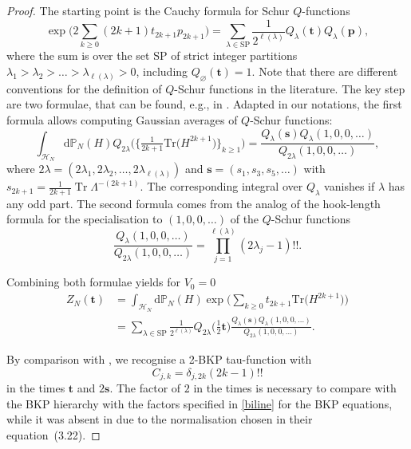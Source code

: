 \documentclass[pdftex]{sigma}
\numberwithin{equation}{section}
\newcommand{\dd}{\mathrm{d}}
\begin{document}
\begin{proof}
The starting point is the Cauchy formula for Schur $Q$-functions
\[
 \exp\biggl(2\sum_{k \geq 0} (2k+1) t_{2k+1}p_{2k+1}\biggr)
 =\sum_{\lambda \in \text{SP}} \frac{1}{2^{\ell(\lambda)}}
 Q_\lambda(\mathbf{t})Q_\lambda(\mathbf{p}),
\]
where the sum is over the set $\text{SP}$ of strict integer partitions
$\lambda_1>\lambda_2>\dots > \lambda_{\ell(\lambda)}>0$,
including $Q_\varnothing(\mathbf{t})=1$. Note that there are different conventions for the definition of $Q$-Schur functions in the literature.
The key step are two formulae, that can be found, e.g., in \cite[equations~(55) and~(56)]{Mironov:2020tjf}. Adapted in our notations, the first formula allows computing Gaussian averages of $Q$-Schur functions:
\begin{equation*}
 \int_{\mathcal{H}_N} \dd \mathbb{P}_N(H)
 Q_{2\lambda}\bigl(\bigl\{\tfrac{1}{2k+1}\mathrm{Tr}\bigl(H^{2k+1}\bigr)\bigr\}_{k \geq 1}\bigr)=
 \frac{Q_\lambda(\mathbf{s})
 Q_\lambda(1,0,0,\dots)}{Q_{2\lambda}(1,0,0,\dots)} ,
\end{equation*}
where $2\lambda=(2\lambda_1,2\lambda_2,\dots,2\lambda_{\ell(\lambda)})$
and $\mathbf{s}=(s_1,s_3,s_5,\dots)$
with $s_{2k+1}=\frac{1}{2k+1}\operatorname{Tr}\Lambda^{-(2k+1)}$.
The corresponding integral over $Q_\lambda$ vanishes if $\lambda$
has any odd part. The second formula comes from the analog of the hook-length formula for the specialisation to $(1,0,0,\dots)$ of the $Q$-Schur functions
\[
\frac{Q_\lambda(1,0,0,\dots)}{Q_{2\lambda}(1,0,0,\dots)}
=\prod_{j=1}^{\ell(\lambda)} (2\lambda_j-1)!!.
\]

Combining both formulae yields for $V_0 = 0$
\begin{align}
Z_N(\mathbf{t}) & = \int_{\mathcal{H}_N} \dd \mathbb{P}_N(H)
 \exp\biggl(\sum_{k \geq 0} t_{2k+1} \mathrm{Tr}\bigl(H^{2k+1}\bigr)\biggr) \nonumber\\
& =\sum_{\lambda \in \text{SP}} \frac{1}{2^{\ell(\lambda)}}
Q_{2\lambda}\bigl(\tfrac{1}{2}\mathbf{t}\bigr)
\frac{Q_\lambda(\mathbf{s})
 Q_\lambda(1,0,0,\dots)}{Q_{2\lambda}(1,0,0,\dots)} .\label{ZNt}
 \end{align}

By comparison with \cite[Lemma 5.5]{MMNO}, we recognise a 2-BKP tau-function with
\[
C_{j,k} = \delta_{j,2k} (2k - 1)!!
\]
in the times $\mathbf{t}$ and $2\mathbf{s}$. The factor of $2$ in the times is necessary to compare with the BKP hierarchy with the factors specified in \eqref{biline} for the BKP equations, while it was absent in \cite{MMNO} due to the normalisation chosen in their equation~(3.22).
\end{proof}
\end{document}
